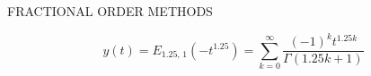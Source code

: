 \begin{frame}{FRACTIONAL ORDER METHODS}
\begin{multicols}{2}
\begin{equation}
    y(t) = E_{1.25,\,1}(-t^{1.25})=\sum_{k=0}^{\infty}\dfrac{(-1)^kt^{1.25k}}{\Gamma(1.25k +1)}
\end{equation}
\null \vfill
\columnbreak
\begin{figure}[H]
        \centering

\end{figure}
\end{multicols}
\end{frame}
